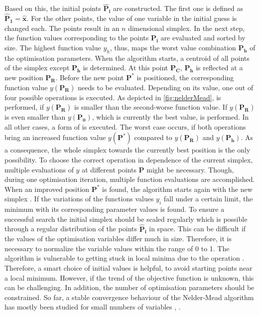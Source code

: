 Based on this, the initial points $\mathbf{\hat{P}_i}$ are constructed. The first one is defined as $\mathbf{\hat{P}_1} = \mathbf{\hat{x}}$. For the other points, the value of one variable in the initial guess is changed each. The points result in an $n$ dimensional simplex. In the next step, the function values corresponding to the points $\mathbf{P_i}$ are evaluated and sorted by size. The highest function value $y_h$, thus, maps the worst value combination $\mathbf{P_h}$ of the optimisation parameters. When the algorithm starts, a centroid of all points of the simplex except $\mathbf{P_h}$ is determined. At this point $\mathbf{P_C}$, $\mathbf{P_h}$ is reflected at a new position $\mathbf{P_R}$. Before the new point $\mathbf{P^{*}}$ is positioned, the corresponding function value $y(\mathbf{P_R})$ needs to be evaluated. Depending on its value, one out of four possible operations is executed. As depicted in \autoref{fig:nelderMead},  is performed, if $y(\mathbf{P_R})$ is smaller than the second-worse function value. If $y(\mathbf{P_R})$ is even smaller than $y(\mathbf{P_0})$, which is currently the best value,  is performed. In all other cases, a form of  is executed. The worst case occurs, if both  operations bring an increased function value $y(\mathbf{P^*})$ compared to $y(\mathbf{P_R})$ and $y(\mathbf{P_h})$. As a consequence,  the whole simplex towards the currently best position is the only possibility. To choose the correct operation in dependence of the current simplex, multiple evaluations of $y$ at different points $\mathbf{P}$ might be necessary. Though, during one optimisation iteration, multiple function evaluations are accomplished. When an improved position $\mathbf{P^{*}}$ is found, the algorithm starts again with the new simplex \cite{nelder_simplex_1965}. If the variations of the functions values $y_i$ fall under a certain limit, the minimum with its corresponding parameter values is found. To ensure a successful search the initial simplex should be scaled regularly \cite{baudin_nelder-mead_nodate} which is possible through a regular distribution of the points $\mathbf{\hat{P}_i}$ in space. This can be difficult if the values of the optimisation variables differ much in size. Therefore, it is necessary to normalize the variable values within the range of 0 to 1. The algorithm is vulnerable to getting stuck in local minima due to the  operation \cite{luersen_globalized_2004}. Therefore, a smart choice of initial values is helpful, to avoid starting points near a local minimum. However, if the trend of the objective function is unknown, this can be challenging. In addition, the number of optimisation parameters should be constrained. So far, a stable convergence behaviour of the Nelder-Mead algorithm has mostly been studied for small numbers of variables \cite{singer_efficient_2004}, \cite{pham_comparative_2011}.





